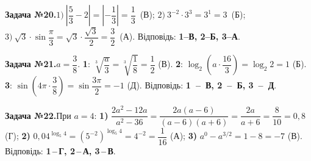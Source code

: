 \documentclass[12pt]{article}
\begin{document}
\par\vspace{0.3cm}\noindent\hypertarget{sol:20}{}
\begin{tcolorbox}[colback=titleBg!40, colframe=mainGreen!55, boxrule=0.4pt, arc=2pt, left=6pt, right=6pt, top=4pt, bottom=4pt, breakable]
\noindent\small\textbf{Задача №20.}\quad $1)\ \left|\dfrac{5}{3}-2\right|=\left|-\dfrac{1}{3}\right|=\dfrac{1}{3}$~(В); $2)\ 3^{-2}\cdot 3^{3}=3^{1}=3$~(Б); $3)\ \sqrt{3}\cdot\sin\dfrac{\pi}{3}=\sqrt{3}\cdot\dfrac{\sqrt{3}}{2}=\dfrac{3}{2}$~(А). Відповідь: \textbf{1--В, 2--Б, 3--А}.
\par\vspace{0.1cm}\hfill\hyperlink{task:20}{}
\end{tcolorbox}
\par\vspace{0.3cm}\noindent\hypertarget{sol:21}{}
\begin{tcolorbox}[colback=titleBg!40, colframe=mainGreen!55, boxrule=0.4pt, arc=2pt, left=6pt, right=6pt, top=4pt, bottom=4pt, breakable]
\noindent\small\textbf{Задача №21.}\quad $a=\dfrac38$. \textbf{1}: $\sqrt[3]{\dfrac{a}{3}}=\sqrt[3]{\dfrac18}=\dfrac12$ (В). \textbf{2}: $\log_2\!\left(a\cdot\dfrac{16}{3}\right)=\log_2 2=1$ (Б). \textbf{3}: $\sin\!\left(4\pi\cdot\dfrac38\right)=\sin\dfrac{3\pi}{2}=-1$ (Д). Відповідь: \textbf{1~--~В, 2~--~Б, 3~--~Д}.
\par\vspace{0.1cm}\hfill\hyperlink{task:21}{}
\end{tcolorbox}
\par\vspace{0.3cm}\noindent\hypertarget{sol:22}{}
\begin{tcolorbox}[colback=titleBg!40, colframe=mainGreen!55, boxrule=0.4pt, arc=2pt, left=6pt, right=6pt, top=4pt, bottom=4pt, breakable]
\noindent\small\textbf{Задача №22.}\quad При $a=4$: \textbf{1)} $\dfrac{2a^2-12a}{a^2-36}=\dfrac{2a(a-6)}{(a-6)(a+6)}=\dfrac{2a}{a+6}=\dfrac{8}{10}=0{,}8$ (Г); \textbf{2)} $0{,}04^{\log_5 4}=(5^{-2})^{\log_5 4}=4^{-2}=\dfrac{1}{16}$ (А); \textbf{3)} $a^0-a^{3/2}=1-8=-7$ (В). Відповідь: \textbf{1\,--\,Г, 2\,--\,А, 3\,--\,В}.
\par\vspace{0.1cm}\hfill\hyperlink{task:22}{}
\end{tcolorbox}
\par\vspace{0.3cm}\noindent\hypertarget{sol:23}{}
\end{document}
